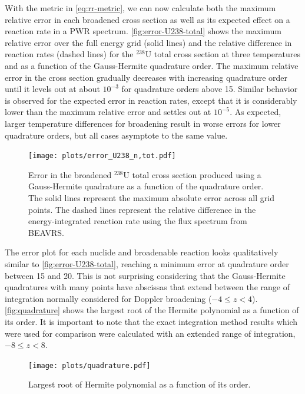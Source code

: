 \documentclass[3p,authoryear]{elsarticle}
\begin{document}
With the metric in \autoref{eq:rr-metric}, we can now calculate both the maximum
relative error in each broadened cross section as well as its expected effect on
a reaction rate in a PWR spectrum. \autoref{fig:error-U238-total} shows the
maximum relative error over the full energy grid (solid lines) and the relative
difference in reaction rates (dashed lines) for the $^{238}$U total cross
section at three temperatures and as a function of the Gauss-Hermite quadrature
order. The maximum relative error in the cross section gradually decreases with
increasing quadrature order until it levels out at about $10^{-3}$ for
quadrature orders above 15. Similar behavior is observed for the expected error
in reaction rates, except that it is considerably lower than the maximum
relative error and settles out at $10^{-5}$. As expected, larger temperature
differences for broadening result in worse errors for lower quadrature orders,
but all cases asymptote to the same value.
\begin{figure}[H]
  \centering
  \texttt{[image: plots/error\_U238\_n,tot.pdf]}
  \caption{Error in the broadened $^{238}$U total cross section produced using a
    Gauss-Hermite quadrature as a function of the quadrature order. The solid
    lines represent the maximum absolute error across all grid points. The
    dashed lines represent the relative difference in the energy-integrated
    reaction rate using the flux spectrum from BEAVRS.}
  \label{fig:error-U238-total}
\end{figure}

The error plot for each nuclide and broadenable reaction looks qualitatively
similar to \autoref{fig:error-U238-total}, reaching a minimum error at
quadrature order between 15 and 20. This is not surprising considering that the
Gauss-Hermite quadratures with many points have abscissas that extend between
the range of integration normally considered for Doppler broadening ($-4 \le z <
4$). \autoref{fig:quadrature} shows the largest root of the Hermite polynomial
as a function of its order. It is important to note that the exact integration
method results which were used for comparison were calculated with an extended
range of integration, $-8 \le z < 8$.
\begin{figure}[H]
  \centering
  \texttt{[image: plots/quadrature.pdf]}
  \caption{Largest root of Hermite polynomial as a function of its order.}
  \label{fig:quadrature}
\end{figure}
\end{document}
